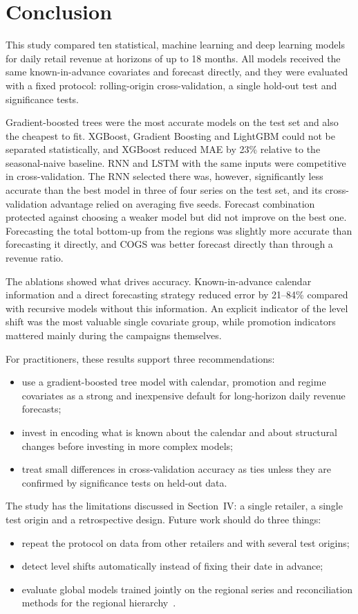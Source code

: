 \documentclass[conference]{IEEEtran}
\begin{document}
\section{Conclusion}
This study compared ten statistical, machine learning and deep learning models for daily retail revenue at horizons of up to 18 months.
All models received the same known-in-advance covariates and forecast directly, and they were evaluated with a fixed protocol: rolling-origin cross-validation, a single hold-out test and significance tests.

Gradient-boosted trees were the most accurate models on the test set and also the cheapest to fit.
XGBoost, Gradient Boosting and LightGBM could not be separated statistically, and XGBoost reduced MAE by 23\% relative to the seasonal-naive baseline.
RNN and LSTM with the same inputs were competitive in cross-validation.
The RNN selected there was, however, significantly less accurate than the best model in three of four series on the test set, and its cross-validation advantage relied on averaging five seeds.
Forecast combination protected against choosing a weaker model but did not improve on the best one.
Forecasting the total bottom-up from the regions was slightly more accurate than forecasting it directly, and COGS was better forecast directly than through a revenue ratio.

The ablations showed what drives accuracy.
Known-in-advance calendar information and a direct forecasting strategy reduced error by 21--84\% compared with recursive models without this information.
An explicit indicator of the level shift was the most valuable single covariate group, while promotion indicators mattered mainly during the campaigns themselves.

For practitioners, these results support three recommendations:
\begin{itemize}
\item use a gradient-boosted tree model with calendar, promotion and regime covariates as a strong and inexpensive default for long-horizon daily revenue forecasts;
\item invest in encoding what is known about the calendar and about structural changes before investing in more complex models;
\item treat small differences in cross-validation accuracy as ties unless they are confirmed by significance tests on held-out data.
\end{itemize}

The study has the limitations discussed in Section~IV: a single retailer, a single test origin and a retrospective design.
Future work should do three things:
\begin{itemize}
\item repeat the protocol on data from other retailers and with several test origins;
\item detect level shifts automatically instead of fixing their date in advance;
\item evaluate global models trained jointly on the regional series and reconciliation methods for the regional hierarchy~\cite{wickramasuriya2019mint}.
\end{itemize}



\end{document}
